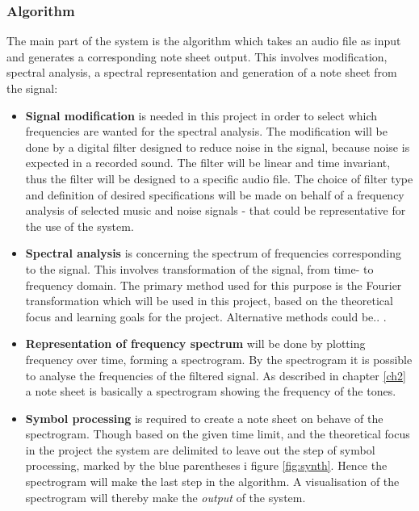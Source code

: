 \subsubsection{Algorithm}
The main part of the system is the algorithm which takes an audio file as input and generates a corresponding note sheet output. This involves modification, spectral analysis, a spectral representation and generation of a note sheet from the signal:
\begin{itemize}
\item[] \textbf{Signal modification} is needed in this project in order to select which frequencies are wanted for the spectral analysis. The modification will be done by a digital filter designed to reduce noise in the signal, because noise is expected in a recorded sound. The filter will be linear and time invariant, thus the filter will be designed to a specific audio file. The choice of filter type and definition of desired specifications will be made on behalf of a frequency analysis of selected music and noise signals - that could be representative for the use of the system.             
\item[] \textbf{Spectral analysis} is concerning the spectrum of frequencies corresponding to the signal. This involves transformation of the signal, from time- to frequency domain.     
The primary method used for this purpose is the Fourier transformation which will be used in this project, based on the theoretical focus and learning goals for the project. Alternative methods could be.. .
\item[] \textbf{Representation of frequency spectrum} will be done by plotting frequency over time, forming a spectrogram. By the spectrogram it is possible to analyse the frequencies of the filtered signal. As described in chapter \ref{ch2} a note sheet is basically a spectrogram showing the frequency of the tones.
\item[] \textbf{Symbol processing} is required to create a note sheet on behave of the spectrogram. 
Though based on the given time limit, and the theoretical focus in the project the system are delimited to leave out the step of symbol processing, marked by the blue parentheses i figure \ref{fig:synth}. Hence the spectrogram will make the last step in the algorithm.
A visualisation of the spectrogram will thereby make the \textit{output} of the system.   
\end{itemize}

